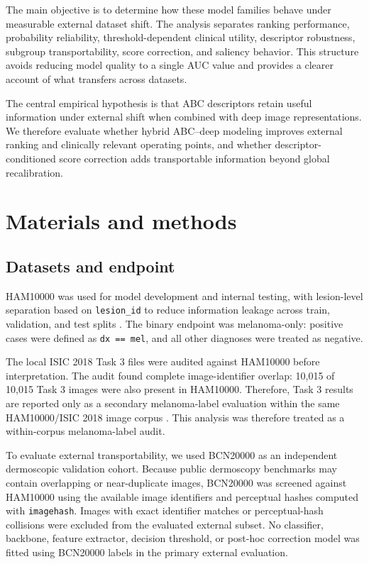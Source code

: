 \documentclass[preprint,12pt]{elsarticle}
\begin{document}
The main objective is to determine how these model families behave under measurable external dataset shift. The analysis separates ranking performance, probability reliability, threshold-dependent clinical utility, descriptor robustness, subgroup transportability, score correction, and saliency behavior. This structure avoids reducing model quality to a single AUC value and provides a clearer account of what transfers across datasets.

The central empirical hypothesis is that ABC descriptors retain useful information under external shift when combined with deep image representations. We therefore evaluate whether hybrid ABC--deep modeling improves external ranking and clinically relevant operating points, and whether descriptor-conditioned score correction adds transportable information beyond global recalibration.

\section{Materials and methods}

\subsection{Datasets and endpoint}

HAM10000 was used for model development and internal testing, with lesion-level separation based on \texttt{lesion\_id} to reduce information leakage across train, validation, and test splits \cite{tschandl2018ham10000}. The binary endpoint was melanoma-only: positive cases were defined as \texttt{dx == mel}, and all other diagnoses were treated as negative.

The local ISIC 2018 Task 3 files were audited against HAM10000 before interpretation. The audit found complete image-identifier overlap: 10,015 of 10,015 Task 3 images were also present in HAM10000. Therefore, Task 3 results are reported only as a secondary melanoma-label evaluation within the same HAM10000/ISIC 2018 image corpus \cite{codella2018isic}. This analysis was therefore treated as a within-corpus melanoma-label audit.

To evaluate external transportability, we used BCN20000 \cite{hernandezperez2024bcn20000} as an independent dermoscopic validation cohort. Because public dermoscopy benchmarks may contain overlapping or near-duplicate images, BCN20000 was screened against HAM10000 using the available image identifiers and perceptual hashes computed with \texttt{imagehash}. Images with exact identifier matches or perceptual-hash collisions were excluded from the evaluated external subset. No classifier, backbone, feature extractor, decision threshold, or post-hoc correction model was fitted using BCN20000 labels in the primary external evaluation.
\end{document}
